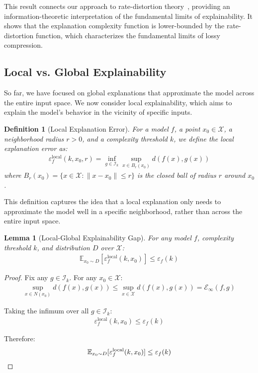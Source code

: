 \documentclass[11pt,letter,leqno]{article}
\newtheorem{lemma}[theorem]{Lemma}
\newtheorem{definition}[theorem]{Definition}
\begin{document}
This result connects our approach to rate-distortion theory~\cite{Shannon1959, Berger1971, Cover2006}, providing an information-theoretic interpretation of the fundamental limits of explainability.  It shows that the explanation complexity function is lower-bounded by the rate-distortion function, which characterizes the fundamental limits of lossy compression.

\subsection{Local vs. Global Explainability}
\label{subsec:local-global}

So far, we have focused on global explanations that approximate the model across the entire input space.  We now consider local explainability, which aims to explain the model's behavior in the vicinity of specific inputs.

\begin{definition}[Local Explanation Error]
\label{def:local-error}
For a model $f$, a point $x_0 \in \mathcal{X}$, a neighborhood radius $r > 0$, and a complexity threshold $k$, we define the local explanation error as:
\begin{align}
\varepsilon_f^{\text{local}}(k, x_0, r) = \inf_{g \in \mathcal{I}_k} \sup_{x \in B_r(x_0)} d(f(x), g(x))
\end{align}
where $B_r(x_0) = \{x \in \mathcal{X} : \|x - x_0\| \leq r\}$ is the closed ball of radius $r$ around $x_0$.
\end{definition}

This definition captures the idea that a local explanation only needs to approximate the model well in a specific neighborhood, rather than across the entire input space.

\begin{lemma}[Local-Global Explainability Gap]
\label{thm:local-global}
For any model $f$, complexity threshold $k$, and distribution $D$ over $\mathcal{X}$:
\begin{align}
\mathbb{E}_{x_0 \sim D}[\varepsilon_f^{\text{local}}(k, x_0)] \leq \varepsilon_f(k)
\end{align}
\end{lemma}

\begin{proof}
Fix any $g \in \mathcal{I}_k$. For any $x_0 \in \mathcal{X}$:
\begin{align}
\sup_{x \in N(x_0)} d(f(x), g(x)) \leq \sup_{x \in \mathcal{X}} d(f(x), g(x)) = \mathcal{E}_{\infty}(f, g)
\end{align}

Taking the infimum over all $g \in \mathcal{I}_k$:
\begin{align}
\varepsilon_f^{\text{local}}(k, x_0) \leq \varepsilon_f(k)
\end{align}

Therefore:
\[ \mathbb{E}_{x_0 \sim D}[\varepsilon_f^{\text{local}}(k, x_0)] \leq \varepsilon_f(k) \qedhere \]

\end{proof}
\end{document}
